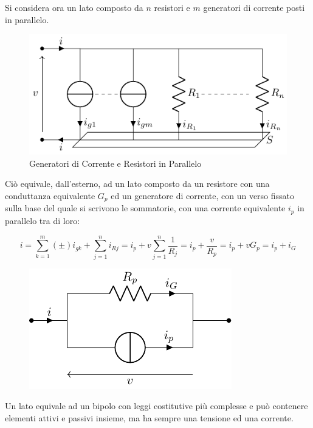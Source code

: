 \documentclass{article}
\numberwithin{equation}{subsection}
\begin{document}
Si considera ora un lato composto da $n$ resistori e $m$ generatori di corrente posti in parallelo. 

\begin{figure}[H]%
    \centering
    \includegraphics{generatore-corrente-resistori-parallelo.pdf}%
    \caption{Generatori di Corrente e Resistori in Parallelo}%
    \label{fig:generatore-corrente-resistori-parallelo}
\end{figure}

Ciò equivale, dall'esterno, ad un lato composto da un resistore con una conduttanza equivalente $G_p$ ed un generatore di corrente, con un verso fissato sulla base del quale si 
scrivono le sommatorie, con una corrente equivalente $i_{p}$ in parallelo tra di loro:

\begin{equation*}
    i=\displaystyle\sum_{k=1}^m(\pm)i_{gk}+\sum_{j=1}^ni_{Rj}=i_{p}+v\sum_{j=1}^n\frac{1}{R_j}=i_{p}+\frac{v}{R_p}=i_{p}+vG_p=i_{p}+i_G
\end{equation*}

\begin{figure}[H]%
    \centering
    \includegraphics{generatore-corrente-resistori-parallelo-equivalente.pdf}%
    \label{fig:generatore-corrente-resistori-parallelo-equivalente}
\end{figure}


Un lato equivale ad un bipolo con leggi costitutive più complesse e può contenere elementi attivi e passivi insieme, ma ha sempre una tensione ed una corrente. 
\end{document}
